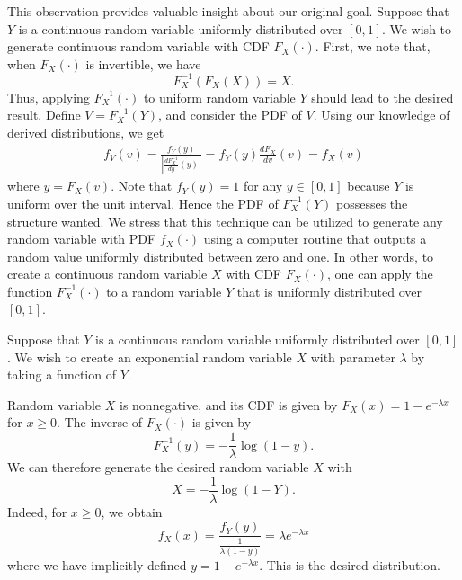 This observation provides valuable insight about our original goal.
Suppose that $Y$ is a continuous random variable uniformly distributed over $[0,1]$.
We wish to generate continuous random variable with CDF $F_X(\cdot)$.
First, we note that, when $F_X (\cdot)$ is invertible, we have
\begin{equation*}
F_X^{-1} \left( F_X (X) \right) = X .
\end{equation*}
Thus, applying $F_X^{-1} (\cdot)$ to uniform random variable $Y$ should lead to the desired result.
Define $V = F_X^{-1} (Y)$, and consider the PDF of $V$.
Using our knowledge of derived distributions, we get
\begin{equation*}
\begin{split}
f_V (v) = \frac{ f_Y (y) }{ \left| \frac{d F_X^{-1}}{dy} (y) \right| }
= f_Y (y) \frac{d F_X}{dv} (v) = f_X (v)
\end{split}
\end{equation*}
where $y = F_X (v)$.
Note that $f_Y (y) = 1$ for any $y \in [0,1]$ because $Y$ is uniform over the unit interval.
Hence the PDF of $F_X^{-1}(Y)$ possesses the structure wanted.
We stress that this technique can be utilized to generate any random variable with PDF $f_X (\cdot)$ using a computer routine that outputs a random value uniformly distributed between zero and one.
In other words, to create a continuous random variable $X$ with CDF $F_X (\cdot)$, one can apply the function $F_X^{-1} (\cdot)$ to a random variable $Y$ that is uniformly distributed over $[0,1]$.

\begin{example}
Suppose that $Y$ is a continuous random variable uniformly distributed over $[0,1]$.
We wish to create an exponential random variable $X$ with parameter $\lambda$ by taking a function of $Y$.

Random variable $X$ is nonnegative, and its CDF is given by $F_X(x) = 1 - e^{- \lambda x}$ for $x \geq 0$.
The inverse of $F_X (\cdot)$ is given by
\begin{equation*}
F_X^{-1} (y) = - \frac{1}{\lambda} \log (1 - y) .
\end{equation*}
We can therefore generate the desired random variable $X$ with
\begin{equation*}
X = - \frac{1}{\lambda} \log (1 - Y) .
\end{equation*}
Indeed, for $x \geq 0$, we obtain
\begin{equation*}
f_X (x) = \frac{ f_Y (y) }{ \frac{1}{\lambda (1 - y)} }
= \lambda e^{- \lambda x}
\end{equation*}
where we have implicitly defined $y = 1 - e^{- \lambda x}$.
This is the desired distribution.
\end{example}


